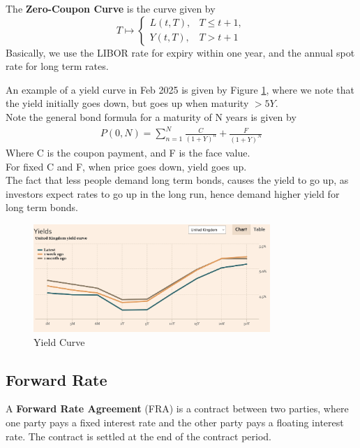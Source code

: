 \begin{definition}
    The \textbf{Zero-Coupon Curve} is the curve given by
$$
    T \mapsto 
\begin{cases} 
    L(t, T), &  T \leq t+1, \\
    Y(t, T), & T > t + 1
\end{cases}
$$
Basically, we use the LIBOR rate for expiry within one year, 
and the annual spot rate for long term rates.

An example of a yield curve in Feb 2025 is given by Figure \ref{fig:yield_curve},
where we note that the yield initially goes down, but goes up when 
maturity $>5Y$.\\
Note the general bond formula for a maturity of N years is given by
\begin{align*}
    P(0, N) = \sum_{n=1}^N \frac{C}{(1 + Y)^n} + \frac{F}{(1 + Y)^N}
\end{align*}
Where C is the coupon payment, and F is the face value.\\
For fixed C and F, when price goes down, yield goes up.\\
The fact that less people demand long term bonds,
causes the yield to go up, as investors expect rates to go up in the long run, 
hence demand higher yield for long term bonds.

\begin{figure}
    \centering
    \includegraphics[width=0.8\textwidth]{plots/yield_curve.png}
    \caption{Yield Curve}
    \label{fig:yield_curve}
\end{figure}
\end{definition}

\subsection{Forward Rate}

    A \textbf{Forward Rate Agreement} (FRA) is a contract between two parties, where one party pays a fixed interest rate and the other party pays a floating interest rate. The contract is settled at the end of the contract period.
    
